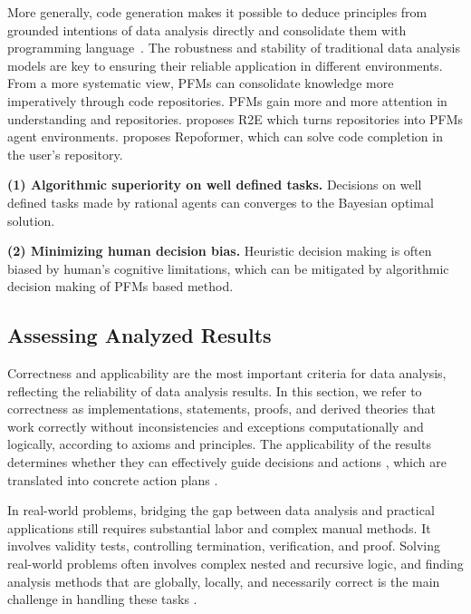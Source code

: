   More generally, code generation makes it possible to deduce principles from grounded intentions of data analysis directly and consolidate them with programming language~\cite{KoziolekGHALE24}. The robustness and stability of traditional data analysis models are key to ensuring their reliable application in different environments. From a more systematic view, PFMs can consolidate knowledge more imperatively through code repositories. PFMs gain more and more attention in understanding and repositories. \cite{jain2024r2e} proposes R2E which turns repositories into PFMs agent environments. \cite{repocomp} proposes Repoformer, which can solve code completion in the user's repository. 

  
\begin{takeawaybox}
    \textbf{(1) Algorithmic superiority on well defined tasks.} Decisions on well defined tasks made by rational agents can converges to the Bayesian optimal solution. 
    
    \textbf{(2) Minimizing human decision bias.} Heuristic decision making is often biased by human's cognitive limitations, which can be mitigated by algorithmic decision making of PFMs based method.
\end{takeawaybox}

  
  
  \subsection{Assessing Analyzed Results} \label{sec:correctness}
  
  Correctness and applicability are the most important criteria for data analysis, reflecting the reliability of data analysis results. In this section, we refer to correctness as implementations, statements, proofs, and derived theories that work correctly without inconsistencies and exceptions computationally and logically, according to axioms and principles. The applicability of the results determines whether they can effectively guide decisions and actions \cite{027davenport2017competing}, which are translated into concrete action plans \cite{040shmueli2011predictive}.
  
  In real-world problems, bridging the gap between data analysis and practical applications still requires substantial labor and complex manual methods. It involves validity tests, controlling termination, verification, and proof. Solving real-world problems often involves complex nested and recursive logic, and finding analysis methods that are globally, locally, and necessarily correct \cite{shao2023synthetic} is the main challenge in handling these tasks \cite{yao2024tree}. 
  
